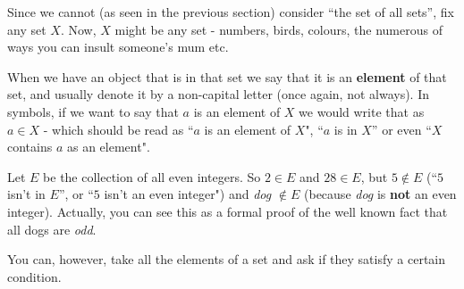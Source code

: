 Since we cannot (as seen in the previous section) consider ``the set of all sets'', fix any set $X$. Now, $X$ might be any set - numbers, birds, colours, the numerous of ways you can insult someone's mum etc.

When we have an object that is in that set we say that it is an \textbf{element} of that set, and usually denote it by a non-capital letter (once again, not always). In symbols, if we want to say that $a$ is an element of $X$ we would write that as $a\in X$ - which should be read as ``$a$ is an element of $X$", ``$a$ is in $X$'' or even ``$X$ contains $a$ as an element".

\begin{ex}
	Let $E$ be the collection of all even integers. So $2\in E$ and $28\in E$, but $5\notin E$ (``$5$ isn't in $E$'', or ``$5$ isn't an even integer") and \textit{dog} $\notin E$ (because \textit{dog} is \textbf{not} an even integer). Actually, you can see this as a formal proof of the well known fact that all dogs are \textit{odd}.
\end{ex}

You can, however, take all the elements of a set and ask if they satisfy a certain condition.

